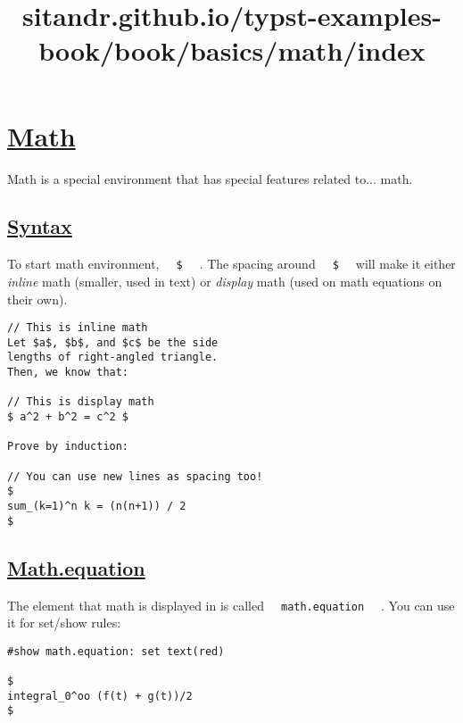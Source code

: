 \title{sitandr.github.io/typst-examples-book/book/basics/math/index}

\section{\texorpdfstring{\hyperref[math]{Math}}{Math}}\label{math}

Math is a special environment that has special features related to...
math.

\subsection{\texorpdfstring{\hyperref[syntax]{Syntax}}{Syntax}}\label{syntax}

To start math environment, \texttt{\ }{\texttt{\ \$\ }}\texttt{\ } . The
spacing around \texttt{\ }{\texttt{\ \$\ }}\texttt{\ } will make it
either \emph{inline} math (smaller, used in text) or \emph{display} math
(used on math equations on their own).

\begin{verbatim}
// This is inline math
Let $a$, $b$, and $c$ be the side
lengths of right-angled triangle.
Then, we know that:

// This is display math
$ a^2 + b^2 = c^2 $

Prove by induction:

// You can use new lines as spacing too!
$
sum_(k=1)^n k = (n(n+1)) / 2
$
\end{verbatim}

\pandocbounded{}

\subsection{\texorpdfstring{\hyperref[mathequation]{Math.equation}}{Math.equation}}\label{mathequation}

The element that math is displayed in is called
\texttt{\ }{\texttt{\ math.equation\ }}\texttt{\ } . You can use it for
set/show rules:

\begin{verbatim}
#show math.equation: set text(red)

$
integral_0^oo (f(t) + g(t))/2
$
\end{verbatim}

\pandocbounded{}

